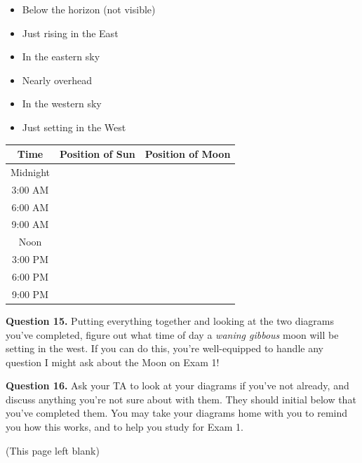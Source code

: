 \documentclass[11pt]{article}
\begin{document}
\begin{itemize}
	\item Below the horizon (not visible)
	\item Just rising in the East
	\item In the eastern sky
	\item Nearly overhead
	\item In the western sky
	\item Just setting in the West
\end{itemize}
\Large
\begin{tabular}{|c|c|c|}
\hline 

Time & Position of Sun & Position of Moon \\ \hline
Midnight & & \\ \hline
3:00 AM & & \\ \hline
6:00 AM & & \\ \hline
9:00 AM & & \\ \hline
Noon   & & \\ \hline
3:00 PM & & \\ \hline
6:00 PM & & \\ \hline
9:00 PM & & \\ \hline
\end{tabular}
\normalsize
\vspace{1.5cm}

\textbf{Question 15.} Putting everything together and looking at the two diagrams you've completed, figure out what time of day a {\it waning gibbous} moon will be setting in the west. If you can do this, you're well-equipped to handle any question I might ask about the Moon on Exam 1!

\vspace{1.5in}

\textbf{Question 16.} Ask your TA to look at your diagrams if you've not already, and discuss anything you're not sure about with them.
They should initial below that you've completed them. You may take your diagrams home with you to remind you how this works, and to help you
study for Exam 1.

\newpage
\begin{center}
	(This page left blank)
\end{center}

\newpage
\end{document}
